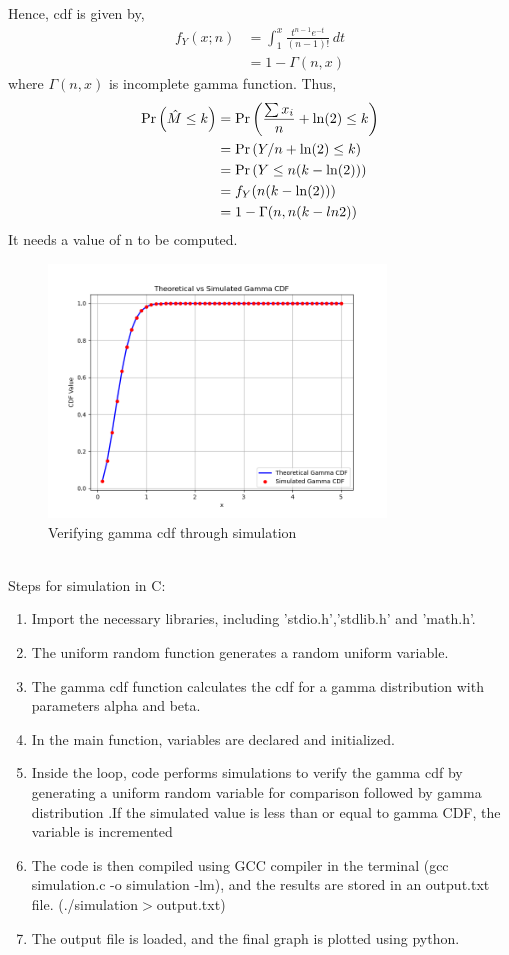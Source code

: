 \documentclass[]{article}
\theoremstyle{remark}
\begin{document}
Hence, cdf is given by,
\begin{align}
f_Y(x;n) &= \int_{1}^{x} \frac{t^{n-1}e^{-t}}{(n-1)!} \,dt \\
&= 1 - \Gamma(n,x)
\end{align}
where $\Gamma(n,x)$ is incomplete gamma function.
Thus,
\begin{align}
\Pr\left(\hat{M} \leq k\right) &= \Pr\left(\frac{\sum x_i}{n} + \ln(2) \leq k\right)\\
&= \Pr\left(Y/n + \ln(2) \leq k\right)\\
&= \Pr\left(Y \leq n(k - \ln(2))\right)\\
&= f_Y(n(k-\ln(2)))\\
&= 1 - \Gamma(n,n(k-ln2))
\end{align}
It needs a value of n to be computed.
\begin{figure}[htbp]
    \centering
    \includegraphics[width=0.8\textwidth]{figs/fig.png} 
    \caption{Verifying gamma cdf through simulation}
    \label{fig:39/2023}
\end{figure}\\
Steps for simulation in C:
\begin{enumerate}
\item Import the necessary libraries, including 'stdio.h','stdlib.h' and 'math.h'.
\item The uniform random function generates a random uniform variable.
\item The gamma cdf function calculates the cdf for a gamma distribution with parameters alpha and beta.
\item In the main function, variables are declared and initialized.
\item Inside the loop, code performs simulations to verify the gamma cdf by generating a uniform random variable for comparison followed by gamma distribution .If the simulated value is less than or equal to gamma CDF, the variable is incremented
\item The code is then compiled using GCC compiler in the terminal (gcc simulation.c -o simulation -lm), and the results are stored in an output.txt file. (./simulation$>$output.txt)
\item The output file is loaded, and the final graph is plotted using python.
\end{enumerate}
\end{document}
